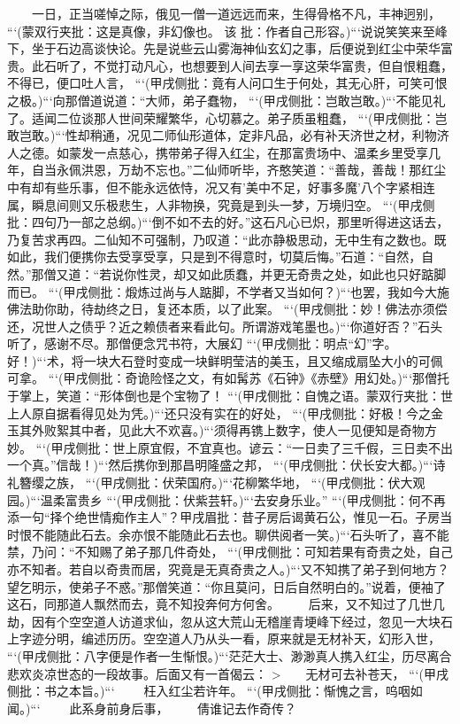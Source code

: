 \documentclass[
    ref = refDemo.bib,
    coverpage = cover.pdf,
    geometry = b5,
    lang = cn
]{spBook}
\begin{document}
    　　一日，正当嗟悼之际，俄见一僧一道远远而来，生得骨格不凡，丰神迥别， ```(蒙双行夹批：这是真像，非幻像也。 该 批：作者自己形容。)```说说笑笑来至峰下，坐于石边高谈快论。先是说些云山雾海神仙玄幻之事，后便说到红尘中荣华富贵。此石听了，不觉打动凡心，也想要到人间去享一享这荣华富贵，但自恨粗蠢，不得已，便口吐人言， ```(甲戌侧批：竟有人问口生于何处，其无心肝，可笑可恨之极。)```向那僧道说道：“大师，弟子蠢物， ```(甲戌侧批：岂敢岂敢。)```不能见礼了。适闻二位谈那人世间荣耀繁华，心切慕之。弟子质虽粗蠢， ```(甲戌侧批：岂敢岂敢。)```性却稍通，况见二师仙形道体，定非凡品，必有补天济世之材，利物济人之德。如蒙发一点慈心，携带弟子得入红尘，在那富贵场中、温柔乡里受享几年，自当永佩洪恩，万劫不忘也。”二仙师听毕，齐憨笑道：“善哉，善哉！那红尘中有却有些乐事，但不能永远依恃，况又有’美中不足，好事多魔’八个字紧相连属，瞬息间则又乐极悲生，人非物换，究竟是到头一梦，万境归空。 ```(甲戌侧批：四句乃一部之总纲。)```倒不如不去的好。”这石凡心已炽，那里听得进这话去，乃复苦求再四。二仙知不可强制，乃叹道：“此亦静极思动，无中生有之数也。既如此，我们便携你去受享受享，只是到不得意时，切莫后悔。”石道：“自然，自然。”那僧又道：“若说你性灵，却又如此质蠢，并更无奇贵之处，如此也只好踮脚而已。 ```(甲戌侧批：煅炼过尚与人踮脚，不学者又当如何？)```也罢，我如今大施佛法助你助，待劫终之日，复还本质，以了此案。 ```(甲戌侧批：妙！佛法亦须偿还，况世人之债乎？近之赖债者来看此句。所谓游戏笔墨也。)```你道好否？”石头听了，感谢不尽。那僧便念咒书符，大展幻 ```(甲戌侧批：明点“幻”字。好！)```术，将一块大石登时变成一块鲜明莹洁的美玉，且又缩成扇坠大小的可佩可拿。 ```(甲戌侧批：奇诡险怪之文，有如髯苏《石钟》《赤壁》用幻处。)```那僧托于掌上，笑道：“形体倒也是个宝物了！ ```(甲戌侧批：自愧之语。蒙双行夹批：世上人原自据看得见处为凭。)```还只没有实在的好处， ```(甲戌侧批：好极！今之金玉其外败絮其中者，见此大不欢喜。)```须得再镌上数字，使人一见便知是奇物方妙。 ```(甲戌侧批：世上原宜假，不宜真也。谚云：“一日卖了三千假，三日卖不出一个真。”信哉！)```然后携你到那昌明隆盛之邦， ```(甲戌侧批：伏长安大都。)```诗礼簪缨之族， ```(甲戌侧批：伏荣国府。)```花柳繁华地， ```(甲戌侧批：伏大观园。)```温柔富贵乡 ```(甲戌侧批：伏紫芸轩。)```去安身乐业。” ```(甲戌侧批：何不再添一句“择个绝世情痴作主人”？甲戌眉批：昔子房后谒黄石公，惟见一石。子房当时恨不能随此石去。余亦恨不能随此石去也。聊供阅者一笑。)```石头听了，喜不能禁，乃问：“不知赐了弟子那几件奇处， ```(甲戌侧批：可知若果有奇贵之处，自己亦不知者。若自以奇贵而居，究竟是无真奇贵之人。)```又不知携了弟子到何地方？望乞明示，使弟子不惑。”那僧笑道：“你且莫问，日后自然明白的。”说着，便袖了这石，同那道人飘然而去，竟不知投奔何方何舍。  
    　　后来，又不知过了几世几劫，因有个空空道人访道求仙，忽从这大荒山无稽崖青埂峰下经过，忽见一大块石上字迹分明，编述历历。空空道人乃从头一看，原来就是无材补天，幻形入世， ```(甲戌侧批：八字便是作者一生惭恨。)```茫茫大士、渺渺真人携入红尘，历尽离合悲欢炎凉世态的一段故事。后面又有一首偈云：  
    >　　无材可去补苍天， ```(甲戌侧批：书之本旨。)```  
    　　枉入红尘若许年。 ```(甲戌侧批：惭愧之言，呜咽如闻。)```  
    　　此系身前身后事，  
    　　倩谁记去作奇传？  
\end{document}
